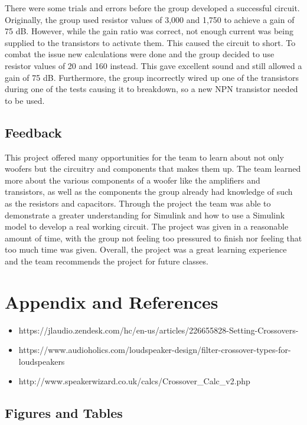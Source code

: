 \documentclass{article}
\begin{document}
\indent There were some trials and errors before the group developed a successful circuit.  Originally, the group used resistor values of 3,000 and 1,750 to achieve a gain of 75 dB.  However, while the gain ratio was correct, not enough current was being supplied to the transistors to activate them.  This caused the circuit to short.  To combat the issue new calculations were done and the group decided to use resistor values of 20 and 160 instead.  This gave excellent sound and still allowed a gain of 75 dB. Furthermore, the group incorrectly wired up one of the transistors during one of the tests causing it to breakdown, so a new NPN transistor needed to be used. 

\subsection{Feedback}
\indent This project offered many opportunities for the team to learn about not only woofers but the circuitry and components that makes them up. The team learned more about the various components of a woofer like the amplifiers and transistors, as well as the components the group already had knowledge of such as the resistors and capacitors. Through the project the team was able to demonstrate a greater understanding for Simulink and how to use a Simulink model to develop a real working circuit. The project was given in a reasonable amount of time, with the group not feeling too pressured to finish nor feeling that too much time was given. Overall, the project was a great learning experience and the team recommends the project for future classes.


\setcounter{figure}{0}
\setcounter{table}{0}
\section{Appendix and References}
\begin{itemize}
\item https://jlaudio.zendesk.com/hc/en-us/articles/226655828-Setting-Crossovers-
\item https://www.audioholics.com/loudspeaker-design/filter-crossover-types-for-loudspeakers
\item http://www.speakerwizard.co.uk/calcs/Crossover\_Calc\_v2.php 
\end{itemize}

\subsection{Figures and Tables}
\end{document}
